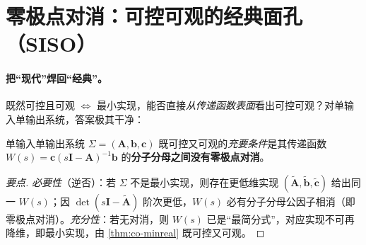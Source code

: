 \section{零极点对消：可控可观的经典面孔（SISO）}
\label{sec:co-cancel}

\paragraph{把“现代”焊回“经典”。}
既然可控且可观 $\iff$ 最小实现，能否直接\emph{从传递函数表面}看出可控可观？对单输入单输出系统，答案极其干净\cite{liubao2006modern}：

\begin{theorem}\label{thm:co-cancel}
单输入单输出系统 $\Sigma=(\mathbf{A},\mathbf{b},\mathbf{c})$ 既可控又可观的\emph{充要条件}是其传递函数 $W(s)=\mathbf{c}(s\mathbf{I}-\mathbf{A})^{-1}\mathbf{b}$ 的\textbf{分子分母之间没有零极点对消}\cite{liubao2006modern}。
\end{theorem}

\begin{proof}[要点]
\emph{必要性}（逆否）：若 $\Sigma$ 不是最小实现，则存在更低维实现 $(\tilde{\mathbf{A}},\tilde{\mathbf{b}},\tilde{\mathbf{c}})$ 给出同一 $W(s)$；因 $\det(s\mathbf{I}-\tilde{\mathbf{A}})$ 阶次更低，$W(s)$ 必有分子分母公因子相消（即零极点对消）。\emph{充分性}：若无对消，则 $W(s)$ 已是“最简分式”，对应实现不可再降维，即最小实现，由 \cref{thm:co-minreal} 既可控又可观\cite{liubao2006modern}。
\end{proof}

